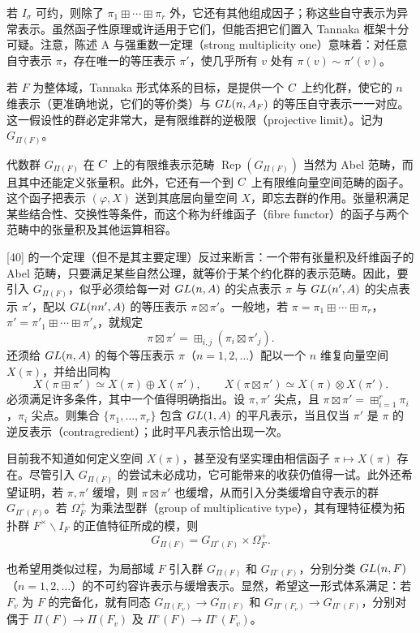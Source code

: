 若 $I_\sigma$ 可约，则除了
$\pi_1\boxplus\cdots\boxplus\pi_r$ 外，它还有其他组成因子；称这些自守表示为异常表示。虽然函子性原理或许适用于它们，但能否把它们置入 Tannaka 框架十分可疑。注意，陈述 A 与强重数一定理（strong multiplicity one）意味着：对任意自守表示
$\pi$，存在唯一的等压表示 $\pi'$，使几乎所有 $v$ 处有 $\pi(v)\sim\pi'(v)$。

若 $F$ 为整体域，Tannaka 形式体系的目标，是提供一个 $C$ 上约化群，使它的
$n$ 维表示（更准确地说，它们的等价类）与 $GL(n,A_F)$ 的等压自守表示一一对应。这一假设性的群必定非常大，是有限维群的逆极限（projective limit）。记为
$G_{\Pi(F)}$。

代数群 $G_{\Pi(F)}$ 在 $C$ 上的有限维表示范畴
$\operatorname{Rep}(G_{\Pi(F)})$ 当然为 Abel 范畴，而且其中还能定义张量积。此外，它还有一个到 $C$ 上有限维向量空间范畴的函子。这个函子把表示 $(\varphi,X)$ 送到其底层向量空间 $X$，即忘去群的作用。张量积满足某些结合性、交换性等条件，而这个称为纤维函子（fibre functor）的函子与两个范畴中的张量积及其他运算相容。

[40] 的一个定理（但不是其主要定理）反过来断言：一个带有张量积及纤维函子的 Abel 范畴，只要满足某些自然公理，就等价于某个约化群的表示范畴。因此，要引入
$G_{\Pi(F)}$，似乎必须给每一对 $GL(n,A)$ 的尖点表示 $\pi$ 与
$GL(n',A)$ 的尖点表示 $\pi'$，配以 $GL(nn',A)$ 的等压表示
$\pi\boxtimes\pi'$。一般地，若
$\pi=\pi_1\boxplus\cdots\boxplus\pi_r$，
$\pi'=\pi'_1\boxplus\cdots\boxplus\pi'_s$，就规定
\[
\pi\boxtimes\pi'=\mathop{\boxplus}_{i,j}(\pi_i\boxtimes\pi'_j).
\]
还须给 $GL(n,A)$ 的每个等压表示 $\pi$（$n=1,2,\ldots$）配以一个
$n$ 维复向量空间 $X(\pi)$，并给出同构
\[
X(\pi\boxplus\pi')\simeq X(\pi)\oplus X(\pi'),\qquad
X(\pi\boxtimes\pi')\simeq X(\pi)\otimes X(\pi').
\]
必须满足许多条件，其中一个值得明确指出。设 $\pi,\pi'$ 尖点，且
$\pi\boxtimes\pi'=\mathop{\boxplus}_{i=1}^r\pi_i$，$\pi_i$ 尖点。则集合
$\{\pi_1,\ldots,\pi_r\}$ 包含 $GL(1,A)$ 的平凡表示，当且仅当
$\pi'$ 是 $\pi$ 的逆反表示（contragredient）；此时平凡表示恰出现一次。

目前我不知道如何定义空间 $X(\pi)$，甚至没有坚实理由相信函子
$\pi\mapsto X(\pi)$ 存在。尽管引入 $G_{\Pi(F)}$ 的尝试未必成功，它可能带来的收获仍值得一试。此外还希望证明，若 $\pi,\pi'$ 缓增，则
$\pi\boxtimes\pi'$ 也缓增，从而引入分类缓增自守表示的群
$G_{\Pi^\circ(F)}$。若 $\Omega_F^+$ 为乘法型群（group of multiplicative type），其有理特征模为拓扑群 $F^\times\backslash I_F$ 的正值特征所成的模，则
\[
G_{\Pi(F)}=G_{\Pi^\circ(F)}\times\Omega_F^+.
\]

也希望用类似过程，为局部域 $F$ 引入群 $G_{\Pi(F)}$ 和 $G_{\Pi^\circ(F)}$，分别分类
$GL(n,F)$（$n=1,2,\ldots$）的不可约容许表示与缓增表示。显然，希望这一形式体系满足：若
$F_v$ 为 $F$ 的完备化，就有同态
$G_{\Pi(F_v)}\to G_{\Pi(F)}$ 和
$G_{\Pi^\circ(F_v)}\to G_{\Pi^\circ(F)}$，分别对偶于
$\Pi(F)\to\Pi(F_v)$ 及 $\Pi^\circ(F)\to\Pi^\circ(F_v)$。

